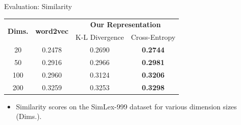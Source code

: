 \documentclass[8pt]{beamer}
\begin{document}
\begin{frame}{Evaluation: Similarity}

   \begin{tabular}{c|c|cc}
        \multirow{2}{*}{\bf Dims.}   & \multirow{2}{*}{\bf word2vec} & \multicolumn{2}{c}{\bf Our Representation} \\ \cline{3-4}
                            &                               & K-L Divergence & Cross-Entropy \\\hline
        20  &   0.2478   & 0.2690 & \bf 0.2744    \\
        50  &   0.2916   & 0.2966 & \bf 0.2981    \\
        100 &   0.2960   & 0.3124 & \bf 0.3206    \\
        200 &   0.3259   & 0.3253 & \bf 0.3298
    \end{tabular}

  \begin{itemize}
    \item Similarity scores on the SimLex-999 dataset for various dimension sizes (Dims.).
  \end{itemize}
\end{frame}
\end{document}
